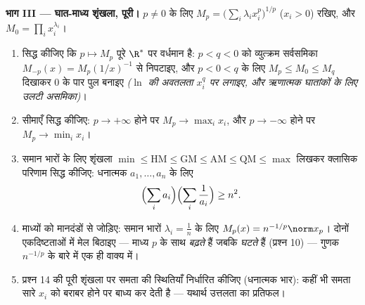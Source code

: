 \begin{problem}[{सप्ताहांत समस्या --- यंग, हॉल्डर, मिंकोव्स्की
और घात-माध्य शृंखला}]
\medskip
\noindent\textbf{भाग III --- घात-माध्य शृंखला, पूरी।} $p \neq 0$ के लिए $M_p = \bigl(\sum_i\lambda_i
x_i^p\bigr)^{1/p}$
($x_i > 0$) रखिए, और $M_0 = \prod_i
x_i^{\lambda_i}$।
\begin{enumerate}[resume]
  \item सिद्ध कीजिए कि $p \mapsto M_p$ पूरे $\R^*$ पर वर्धमान है: $p < q < 0$ को व्युत्क्रम
        सर्वसमिका $M_{-p}(x) = M_p(1/x)^{-1}$ से निपटाइए, और $p < 0 < q$ के लिए $M_p \leq M_0 \leq M_q$ दिखाकर $0$ के पार
        पुल बनाइए \emph{($\ln$ की अवतलता $x_i^q$ पर लगाइए, और ऋणात्मक घातांकों
        के लिए उलटी असमिका)}।
  \item सीमाएँ सिद्ध कीजिए: $p \to
        +\infty$ होने पर $M_p \to \max_i x_i$, और $p \to -\infty$ होने पर $M_p \to \min_i x_i$।
  \item समान भारों के लिए शृंखला $\min \leq \mathrm{HM} \leq
        \mathrm{GM} \leq \mathrm{AM} \leq \mathrm{QM} \leq
        \max$ लिखकर क्लासिक परिणाम सिद्ध कीजिए:
        धनात्मक $a_1, \dots, a_n$ के लिए
        \[
        \Bigl(\sum_i a_i\Bigr)\Bigl(\sum_i\frac1{a_i}\Bigr)
        \geq n^2 .
        \]
  \item माध्यों को मानदंडों से जोड़िए: समान भारों $\lambda_i =
        \frac1n$ के लिए $M_p(x) = n^{-1/p}\norm x_p$।
        दोनों एकदिष्टताओं में मेल बिठाइए --- माध्य $p$ के साथ
        \emph{बढ़ते} हैं जबकि  \emph{घटते} हैं (प्रश्न 10) ---
        गुणक $n^{-1/p}$ के बारे में एक ही वाक्य में।
  \item प्रश्न 14 की पूरी शृंखला पर समता की स्थितियाँ निर्धारित कीजिए
        (धनात्मक भार): कहीं भी समता सारे $x_i$ को बराबर होने पर बाध्य कर
        देती है --- यथार्थ उत्तलता का प्रतिफल।
\end{enumerate}


\end{problem}
